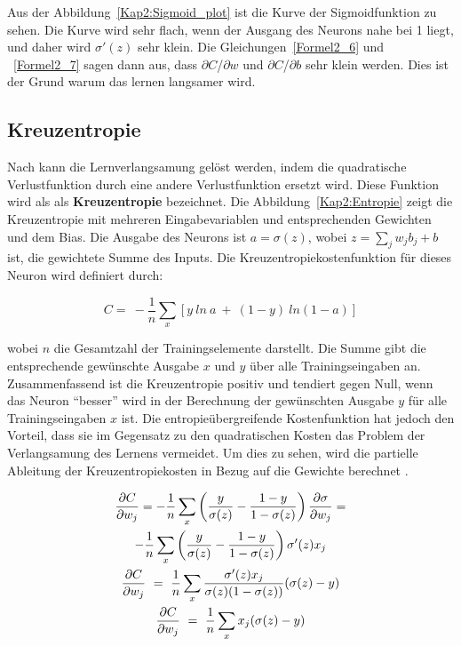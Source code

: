         Aus der Abbildung~\ref{Kap2:Sigmoid_plot} ist die Kurve der Sigmoidfunktion zu sehen. Die Kurve wird sehr flach, wenn der Ausgang des Neurons nahe bei 1 liegt, und daher wird $\sigma'(z)$ sehr klein. Die Gleichungen~\ref{Formel2_6} und ~\ref{Formel2_7} sagen dann aus, dass $\partial$$C$/$\partial$$w$  und  $\partial$$C$/$\partial$$b$ sehr klein werden. Dies ist der Grund warum das lernen langsamer wird.

    \subsection{Kreuzentropie}
    Nach \cite*[62]{Nielsen2015} kann die Lernverlangsamung gelöst werden, indem die quadratische Verlustfunktion durch eine andere Verlustfunktion ersetzt wird. Diese Funktion wird als als \textbf{Kreuzentropie} bezeichnet. Die Abbildung~\ref{Kap2:Entropie} zeigt die Kreuzentropie mit mehreren Eingabevariablen und entsprechenden Gewichten und dem Bias. Die Ausgabe des Neurons ist $a = \sigma(z)$, wobei $z =  \sum _{j} w_{j} b_{j} + b$ ist, die gewichtete Summe des Inputs. Die Kreuzentropiekostenfunktion für dieses Neuron wird definiert durch:

    \begin{equation} \label{Formel2_8}
        C=\ -\frac{1}{n}\sum _{x}[ y\ ln\ a\ +\ ( 1-y) \ ln( 1-a)]
    \end{equation}

    wobei $n$ die Gesamtzahl der Trainingselemente darstellt. Die Summe gibt die entsprechende gewünschte Ausgabe $x$ und $y$ über alle Trainingseingaben an. Zusammenfassend ist die Kreuzentropie positiv und tendiert gegen Null, wenn das Neuron
    \enquote{besser} wird in der Berechnung der gewünschten Ausgabe $y$ für alle Trainingseingaben $x$ ist.  Die entropieübergreifende Kostenfunktion hat jedoch den Vorteil, dass sie im Gegensatz zu den quadratischen Kosten das Problem der Verlangsamung des Lernens vermeidet. Um dies zu sehen, wird die partielle Ableitung der Kreuzentropiekosten in Bezug auf die Gewichte berechnet \cite*[63]{Nielsen2015}.

    \begin{gather} \label{Formel2_9}
        \frac{\partial C}{\partial w_{j}} =-\frac{1}{n}\sum _{x}\left(\frac{y}{\sigma ( z)} -\frac{1-y}{1-\sigma ( z)}\right)\frac{\partial \sigma }{\partial w_{j}} = \notag\\
        -\frac{1}{n}\sum _{x}\left(\frac{y}{\sigma ( z)} -\frac{1-y}{1-\sigma ( z)}\right) \sigma '( z) x_{j}
        \notag\\
        \frac{\partial C}{\partial w_{j}} \ =\ \frac{1}{n}\sum _{x}\frac{\sigma '( z) x_{j}}{\sigma ( z)( 1-\sigma ( z))}( \sigma ( z) -y)
        \notag\\
        \frac{\partial C}{\partial w_{j}} \ =\ \frac{1}{n}\sum _{x} x_{j}( \sigma ( z) -y)
    \end{gather}

